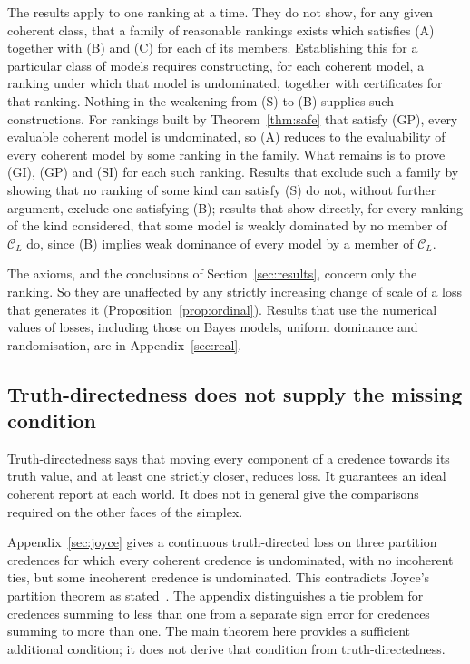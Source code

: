 \documentclass[11pt]{article}
\theoremstyle{definition}
\theoremstyle{remark}
\newcommand{\C}{\mathcal C}
\begin{document}
The results apply to one ranking at a time. They do not show, for any given coherent class, that a family of reasonable rankings exists which satisfies (A) together with (B) and (C) for each of its members. Establishing this for a particular class of models requires constructing, for each coherent model, a ranking under which that model is undominated, together with certificates for that ranking. Nothing in the weakening from (S) to (B) supplies such constructions. For rankings built by Theorem~\ref{thm:safe} that satisfy (GP), every evaluable coherent model is undominated, so (A) reduces to the evaluability of every coherent model by some ranking in the family. What remains is to prove (GI), (GP) and (SI) for each such ranking. Results that exclude such a family by showing that no ranking of some kind can satisfy (S) do not, without further argument, exclude one satisfying (B); results that show directly, for every ranking of the kind considered, that some model is weakly dominated by no member of $\C_L$ do, since (B) implies weak dominance of every model by a member of $\C_L$.

The axioms, and the conclusions of Section~\ref{sec:results}, concern only the ranking. So they are unaffected by any strictly increasing change of scale of a loss that generates it (Proposition~\ref{prop:ordinal}). Results that use the numerical values of losses, including those on Bayes models, uniform dominance and randomisation, are in Appendix~\ref{sec:real}.

\subsection{Truth-directedness does not supply the missing condition}
Truth-directedness says that moving every component of a credence towards its truth value, and at least one strictly closer, reduces loss. It guarantees an ideal coherent report at each world. It does not in general give the comparisons required on the other faces of the simplex.

Appendix~\ref{sec:joyce} gives a continuous truth-directed loss on three partition credences for which every coherent credence is undominated, with no incoherent ties, but some incoherent credence is undominated. This contradicts Joyce's partition theorem as stated~\cite[Theorem~2]{Joyce}. The appendix distinguishes a tie problem for credences summing to less than one from a separate sign error for credences summing to more than one. The main theorem here provides a sufficient additional condition; it does not derive that condition from truth-directedness.
\end{document}
